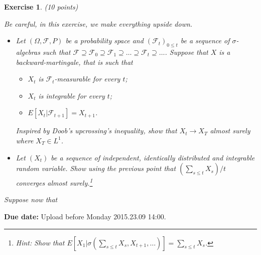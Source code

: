 \documentclass[DIV=classic,a4paper,10pt]{scrartcl}
\newtheorem{exercise}[theorem]{Exercise}
\theoremstyle{nonumberplain}
\newtheorem{proof}{Proof}
\numberwithin{equation}{section}
\begin{document}
\begin{exercise}(10 points)

    Be careful, in this exercise, we make everything upside down.

    \begin{itemize}
        \item     Let $(\Omega, \mathcal{F},P)$ be a probability space and $(\mathcal{F}_t)_{0\leq t}$ be a sequence of $\sigma$-algebras such that $\mathcal{F}\supseteq \mathcal{F}_0\supseteq \mathcal{F}_1\supseteq \ldots \supseteq \mathcal{F}_t\supseteq \ldots$.
            Suppose that $X$ is a backward-martingale, that is such that 
            \begin{itemize}
                \item $X_t$ is $\mathcal{F}_t$-measurable for every $t$;
                \item $X_t$ is integrable for every $t$;
                \item $E[X_t|\mathcal{F}_{t+1}]=X_{t+1}$.
            \end{itemize}
            Inspired by Doob's upcrossing's inequality, show that $X_t\to X_T$ almost surely where $X_T \in L^1$.

       \item Let $(X_t)$ be a sequence of independent, identically distributed and integrable random variable.
           Show using the previous point that $(\sum_{s\leq t}X_s)/t$ converges almost surely.\footnote{Hint: Show that $E[X_1|\sigma(\sum_{s\leq t}X_s, X_{t+1},\ldots)]=\sum_{s\leq t}X_s$.}

    \end{itemize}
    Suppose now that 
\end{exercise}






\smallskip
\noindent
\textbf{Due date:} Upload before Monday 2015.23.09 14:00.
\end{document}
